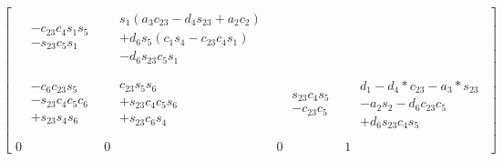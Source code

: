 \begin{equation}
\begin{bmatrix}
\begin{aligned}
             &- c_{23}c_4s_1s_5 \\
             & -s_{23}c_5s_1
        \end{aligned}                               &
        \begin{aligned}
             & s_1\left(a_3c_{23} - d_4s_{23} + a_2c_2\right)                        \\
             & +d_6s_5\left(c_1s_4 - c_{23}c_4s_1\right) \\
             &- d_6s_{23}c_5s_1
        \end{aligned}              \\\\
        \begin{aligned}
             & -c_6c_{23}s_5 \\
             &- s_{23}c_4c_5c_6 \\
             & +s_{23}s_4s_6
        \end{aligned}                           &
        \begin{aligned}
             & c_{23}s_5s_6 \\
             &+ s_{23}c_4c_5s_6 \\
             & +s_{23}c_6s_4
        \end{aligned}                            &
        \begin{aligned}
             & s_{23}c_4s_5 \\
             & -c_{23}c_5
        \end{aligned}                                                        &
        \begin{aligned}
             & d_1 - d_4*c_{23} - a_3*s_{23} \\
             & - a_2s_2 -d_6c_{23}c_5 \\
             & + d_6s_{23}c_4s_5
        \end{aligned}                                          \\\\
        0                                                                         & 0 & 0 & 1
    \end{bmatrix}
\end{equation}

